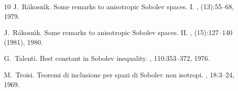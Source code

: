 \documentclass[11pt]{amsart}
\theoremstyle{plain}
\theoremstyle{definition}
\numberwithin{equation}{section}
\begin{document}
\begin{thebibliography}{10}
J.~R\'{a}kosn\'{\i}k.
\newblock Some remarks to anisotropic {S}obolev spaces. {I}.
, (13):55--68, 1979.

J.~R\'{a}kosn\'{\i}k.
\newblock Some remarks to anisotropic {S}obolev spaces. {II}.
, (15):127--140 (1981), 1980.

G.~Talenti.
\newblock Best constant in {S}obolev inequality.
, 110:353--372, 1976.

M.~Troisi.
\newblock Teoremi di inclusione per spazi di {S}obolev non isotropi.
, 18:3--24, 1969.

\end{thebibliography}
\end{document}
